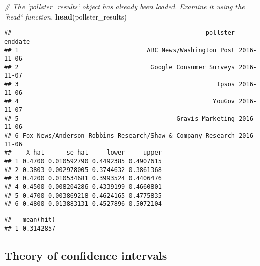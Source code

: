 \documentclass[]{article}
\newenvironment{Shaded}{\begin{snugshade}}{\end{snugshade}}
\newcommand{\KeywordTok}[1]{\textcolor[rgb]{0.13,0.29,0.53}{\textbf{#1}}}
\newcommand{\DataTypeTok}[1]{\textcolor[rgb]{0.13,0.29,0.53}{#1}}
\newcommand{\FloatTok}[1]{\textcolor[rgb]{0.00,0.00,0.81}{#1}}
\newcommand{\StringTok}[1]{\textcolor[rgb]{0.31,0.60,0.02}{#1}}
\newcommand{\CommentTok}[1]{\textcolor[rgb]{0.56,0.35,0.01}{\textit{#1}}}
\newcommand{\OperatorTok}[1]{\textcolor[rgb]{0.81,0.36,0.00}{\textbf{#1}}}
\newcommand{\NormalTok}[1]{#1}
\begin{document}
\begin{Shaded}
\begin{Highlighting}[]
\CommentTok{# The `pollster_results` object has already been loaded. Examine it using the `head` function.}
\KeywordTok{head}\NormalTok{(pollster_results)}
\end{Highlighting}
\end{Shaded}

\begin{verbatim}
##                                                     pollster    enddate
## 1                                   ABC News/Washington Post 2016-11-06
## 2                                    Google Consumer Surveys 2016-11-07
## 3                                                      Ipsos 2016-11-06
## 4                                                     YouGov 2016-11-07
## 5                                           Gravis Marketing 2016-11-06
## 6 Fox News/Anderson Robbins Research/Shaw & Company Research 2016-11-06
##    X_hat      se_hat     lower     upper
## 1 0.4700 0.010592790 0.4492385 0.4907615
## 2 0.3803 0.002978005 0.3744632 0.3861368
## 3 0.4200 0.010534681 0.3993524 0.4406476
## 4 0.4500 0.008204286 0.4339199 0.4660801
## 5 0.4700 0.003869218 0.4624165 0.4775835
## 6 0.4800 0.013883131 0.4527896 0.5072104
\end{verbatim}

\begin{Shaded}
\end{Shaded}

\begin{verbatim}
##   mean(hit)
## 1 0.3142857
\end{verbatim}

\subsection{\texorpdfstring{\textbf{Theory of confidence
intervals}}{Theory of confidence intervals}}\label{theory-of-confidence-intervals}
\end{document}
